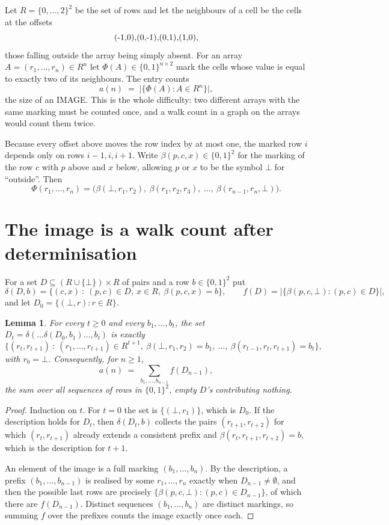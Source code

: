 \documentclass[11pt,a4paper]{article}
\theoremstyle{plain}
\newtheorem{lemma}[theorem]{Lemma}
\theoremstyle{definition}
\begin{document}
Let $R=\{0,\dots,2\}^{2}$ be the set of rows and let the neighbours of a cell be the
cells at the offsets
\[
$(-1,0)$, $(0,-1)$, $(0,1)$, $(1,0)$,
\]
those falling outside the array being simply absent. For an array
$A=(r_1,\dots,r_n)\in R^n$ let $\Phi(A)\in\{0,1\}^{n\times2}$ mark the cells whose value
is equal to exactly two of its neighbours. The entry counts
\[
a(n)\;=\;\bigl|\{\Phi(A):A\in R^n\}\bigr| ,
\]
the size of an IMAGE. This is the whole difficulty: two different arrays with the same marking
must be counted once, and a walk count in a graph on the arrays would count them twice.

Because every offset above moves the row index by at most one, the marked row $i$ depends only
on rows $i-1,i,i+1$. Write $\beta(p,c,x)\in\{0,1\}^{2}$ for the marking of the row $c$
with $p$ above and $x$ below, allowing $p$ or $x$ to be the symbol $\bot$ for ``outside''.
Then
\[
\Phi(r_1,\dots,r_n)=\bigl(\beta(\bot,r_1,r_2),\ \beta(r_1,r_2,r_3),\ \dots,\
\beta(r_{n-1},r_n,\bot)\bigr).
\]

\section{The image is a walk count after determinisation}

For a set $D\subseteq(R\cup\{\bot\})\times R$ of pairs and a row $b\in\{0,1\}^{2}$ put
\[
\delta(D,b)=\{(c,x)\ :\ (p,c)\in D,\ x\in R,\ \beta(p,c,x)=b\},\qquad
f(D)=\bigl|\{\beta(p,c,\bot):(p,c)\in D\}\bigr| ,
\]
and let $D_0=\{(\bot,r):r\in R\}$.

\begin{lemma}\label{lem:det}
For every $t\ge0$ and every $b_1,\dots,b_t$, the set
$D_t=\delta(\dots\delta(D_0,b_1)\dots,b_t)$ is exactly
\[
\{(r_t,r_{t+1})\ :\ (r_1,\dots,r_{t+1})\in R^{t+1},\ \beta(\bot,r_1,r_2)=b_1,\ \dots,\
\beta(r_{t-1},r_t,r_{t+1})=b_t\} ,
\]
with $r_0=\bot$. Consequently, for $n\ge1$,
\[
a(n)\;=\;\sum_{b_1,\dots,b_{n-1}}f(D_{n-1}),
\]
the sum over all sequences of rows in $\{0,1\}^{2}$, empty $D$'s contributing nothing.
\end{lemma}

\begin{proof}
Induction on $t$. For $t=0$ the set is $\{(\bot,r_1)\}$, which is $D_0$. If the description
holds for $D_t$, then $\delta(D_t,b)$ collects the pairs $(r_{t+1},r_{t+2})$ for which
$(r_t,r_{t+1})$ already extends a consistent prefix and
$\beta(r_t,r_{t+1},r_{t+2})=b$, which is the description for $t+1$.

An element of the image is a full marking $(b_1,\dots,b_n)$. By the description, a prefix
$(b_1,\dots,b_{n-1})$ is realised by some $r_1,\dots,r_n$ exactly when $D_{n-1}\neq
\emptyset$, and then the possible last rows are precisely
$\{\beta(p,c,\bot):(p,c)\in D_{n-1}\}$, of which there are $f(D_{n-1})$. Distinct
sequences $(b_1,\dots,b_n)$ are distinct markings, so summing $f$ over the prefixes counts the
image exactly once each.
\end{proof}
\end{document}
